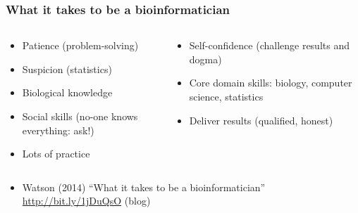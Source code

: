 \begin{frame}
  \frametitle{What it takes to be a bioinformatician}
  \begin{columns}[t]
    \begin{column}{5cm}
      \begin{itemize}
        \item Patience (problem-solving)
        \item Suspicion (statistics)
        \item Biological knowledge
        \item Social skills (no-one knows everything: ask!)
        \item Lots of practice          
      \end{itemize}
    \end{column}
    \begin{column}{5cm}
      \begin{itemize}
        \item Self-confidence (challenge results and dogma)
        \item Core domain skills: biology, computer science, statistics
        \item Deliver results (qualified, honest)
      \end{itemize}
    \end{column}
  \end{columns}
  \begin{itemize}
    \item Watson (2014) ``What it takes to be a bioinformatician'' \url{http://bit.ly/1jDuQsO} (blog)
  \end{itemize}
\end{frame}

